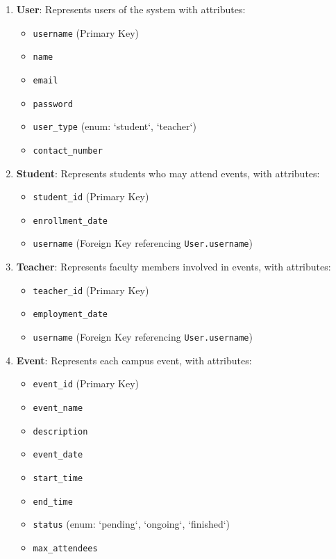 \begin{enumerate}
    \item \textbf{User}: Represents users of the system with attributes:
    \begin{itemize}
        \item \texttt{username} (Primary Key)
        \item \texttt{name}
        \item \texttt{email}
        \item \texttt{password}
        \item \texttt{user\_type} (enum: `student`, `teacher`)
        \item \texttt{contact\_number}
    \end{itemize}

    \item \textbf{Student}: Represents students who may attend events, with attributes:
    \begin{itemize}
        \item \texttt{student\_id} (Primary Key)
        \item \texttt{enrollment\_date}
        \item \texttt{username} (Foreign Key referencing \texttt{User.username})

    \end{itemize}

    \item \textbf{Teacher}: Represents faculty members involved in events, with attributes:
    \begin{itemize}
        \item \texttt{teacher\_id} (Primary Key)
        \item \texttt{employment\_date}
        \item \texttt{username} (Foreign Key referencing \texttt{User.username})
    \end{itemize}

    \item \textbf{Event}: Represents each campus event, with attributes:
    \begin{itemize}
        \item \texttt{event\_id} (Primary Key)
        \item \texttt{event\_name}
        \item \texttt{description}
        \item \texttt{event\_date}
        \item \texttt{start\_time}
        \item \texttt{end\_time}
        \item \texttt{status} (enum: `pending`, `ongoing`, `finished`)
        \item \texttt{max\_attendees}
        

\end{itemize}
\end{enumerate}
